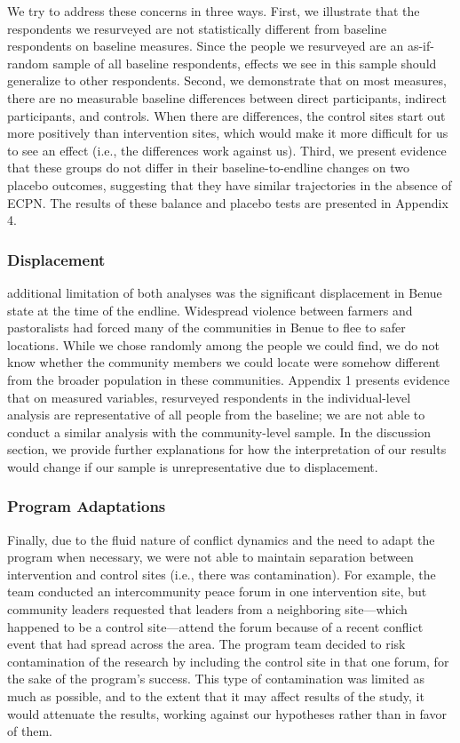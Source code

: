 \documentclass[11pt]{article}
\begin{document}
We try to address these concerns in three ways. First, we illustrate
that the respondents we resurveyed are not statistically different from
baseline respondents on baseline measures. Since the people we
resurveyed are an as-if-random sample of all baseline respondents,
effects we see in this sample should generalize to other respondents.
Second, we demonstrate that on most measures, there are no measurable
baseline differences between direct participants, indirect participants,
and controls. When there are differences, the control sites start out
more positively than intervention sites, which would make it more
difficult for us to see an effect (i.e., the differences work against
us). Third, we present evidence that these groups do not differ in their
baseline-to-endline changes on two placebo outcomes, suggesting that
they have similar trajectories in the absence of ECPN. The results of
these balance and placebo tests are presented in Appendix 4.

\hypertarget{displacement}{%
\subsubsection{Displacement}\label{displacement}}

additional limitation of both analyses was the significant displacement
in Benue state at the time of the endline. Widespread violence between
farmers and pastoralists had forced many of the communities in Benue to
flee to safer locations. While we chose randomly among the people we
could find, we do not know whether the community members we could locate
were somehow different from the broader population in these communities.
Appendix 1 presents evidence that on measured variables, resurveyed
respondents in the individual-level analysis are representative of all
people from the baseline; we are not able to conduct a similar analysis
with the community-level sample. In the discussion section, we provide
further explanations for how the interpretation of our results would
change if our sample is unrepresentative due to displacement.

\hypertarget{program-adaptations}{%
\subsubsection{Program Adaptations}\label{program-adaptations}}

Finally, due to the fluid nature of conflict dynamics and the need to
adapt the program when necessary, we were not able to maintain
separation between intervention and control sites (i.e., there was
contamination). For example, the team conducted an intercommunity peace
forum in one intervention site, but community leaders requested that
leaders from a neighboring site---which happened to be a control
site---attend the forum because of a recent conflict event that had
spread across the area. The program team decided to risk contamination
of the research by including the control site in that one forum, for the
sake of the program's success. This type of contamination was limited as
much as possible, and to the extent that it may affect results of the
study, it would attenuate the results, working against our hypotheses
rather than in favor of them.
\end{document}

